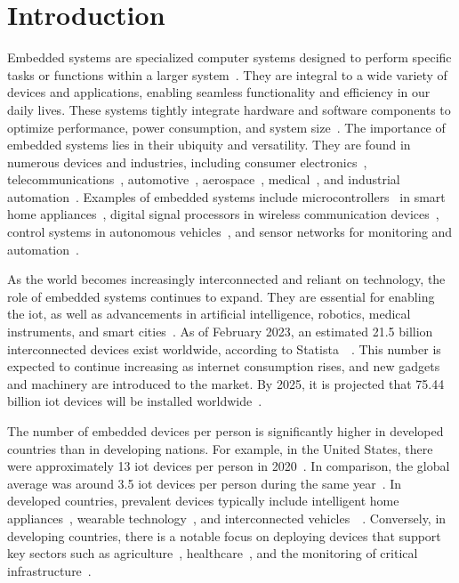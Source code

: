 
\chapter{Introduction}
\label{sec:sec_introduction}
Embedded systems are specialized computer systems designed to perform specific tasks or functions
within a larger system~\cite{muench2018you}. They are integral to a wide variety of devices and
applications, enabling seamless functionality and efficiency in our daily lives. These systems
tightly integrate hardware and software components to optimize performance, power consumption,
and system size~\cite{eisele2022embedded}. The importance of embedded systems lies in their
ubiquity and versatility. They are found in numerous devices and industries, including consumer
electronics~\cite{andrae2010life}, telecommunications~\cite{paulin1995dsp},
automotive~\cite{Automoti68:online}, aerospace~\cite{bieber2012security},
medical~\cite{jafari2007medical}, and industrial automation~\cite{thramboulidis2007soa}.
Examples of embedded systems include microcontrollers~\cite{gridling2007introduction} in
smart home appliances~\cite{kang2017enhanced}, digital signal processors in wireless
communication devices~\cite{kostic1997digital}, control systems in autonomous
vehicles~\cite{kostic1997digital}, and sensor networks for monitoring and
automation~\cite{marwedel2021embedded}.


As the world becomes increasingly interconnected and reliant on technology,
the role of embedded systems continues to expand. They are essential for
enabling the \gls{iot}, as well as advancements in artificial intelligence,
robotics, medical instruments, and smart cities~\cite{camposano1996embedded:ARTICLE}.
As of February 2023, an estimated 21.5 billion interconnected devices
exist worldwide, according to Statista~\cite{IoTconne16:online}~\cite{HowManyI1:online}.
This number is expected to continue increasing as internet consumption rises, and
new gadgets and machinery are introduced to the market. By 2025,
it is projected that 75.44 billion \acrshort{iot} devices will be
installed worldwide~\cite{HowManyI1:online}.

The number of embedded devices per person is significantly higher in developed
countries than in developing nations. For example, in the United States, there
were approximately 13 \acrshort{iot} devices per person in 2020~\cite{Stateoft48:online}.
In comparison, the global average was around 3.5 \acrshort{iot} devices per person during
the same year~\cite{CiscoAnn1:online}. In developed countries, prevalent devices
typically include intelligent home appliances~\cite{wang2015anycontrol},
wearable technology~\cite{poongodi2020wearable}, and
interconnected vehicles~\cite{priyan2019survey}~\cite{Internet36:online}.
Conversely, in developing countries, there is a notable focus on deploying
devices that support key sectors such as
agriculture~\cite{baranwal2016development}, healthcare~\cite{pradhan2021iot},
and the monitoring of critical infrastructure~\cite{patil2012internet}.


